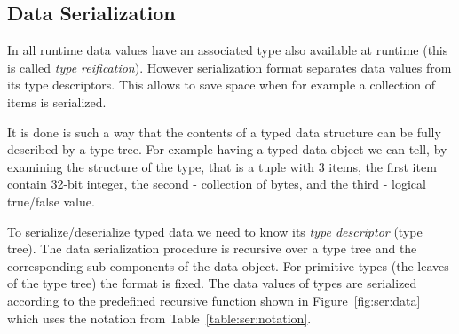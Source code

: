 \subsection{Data Serialization}
\label{sec:ser:data}

In \langname all runtime data values have an associated type also available
at runtime (this is called \emph{type reification}\cite{Reification}).
However serialization format separates data values from its type descriptors. 
This allows to save space when for example a collection of items is serialized.

It is done is such a way that the contents of a typed data structure can be fully
described by a type tree. For example having a typed data object  we can tell, by examining the structure of the type, that 
is a tuple with 3 items, the first item contain 32-bit integer, the second - collection
of bytes, and the third - logical true/false value.

To serialize/deserialize typed data we need to know its \emph{type descriptor} (type
tree). The data serialization procedure is recursive over a type tree and the
corresponding sub-components of the data object. For primitive types (the leaves of the
type tree) the format is fixed. The data values of \langname types are serialized
according to the predefined recursive function shown in Figure~\ref{fig:ser:data} which
uses the notation from Table~\ref{table:ser:notation}.

